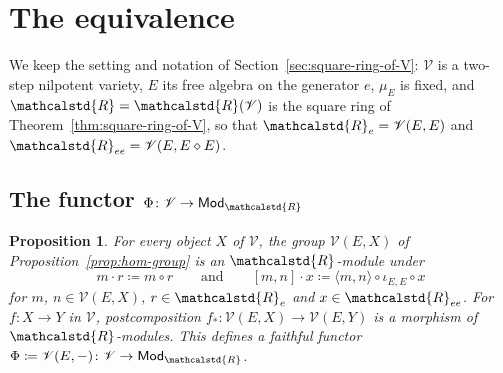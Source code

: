 \documentclass[reqno,a4paper]{amsart}
\theoremstyle{plain}
\newtheorem{proposition}[subsection]{Proposition}
\theoremstyle{definition}
\newcommand{\DefEq}{\coloneq}
\newcommand{\V}{\ensuremath{\mathcal{V}}}
\newcommand{\R}{\ensuremath{\mathcalstd{R}}}
\newcommand{\Mod}{\ensuremath{\mathsf{Mod}}}
\newcommand{\cosmash}{\ensuremath{\diamond}}
\renewcommand{\Re}{\ensuremath{\R_{e}}}
\newcommand{\Ree}{\ensuremath{\R_{ee}}}
\newcommand{\brk}[2]{\ensuremath{[#1,#2]}}
\begin{document}
\section{The equivalence}\label{sec:equivalence}

We keep the setting and notation of Section~\ref{sec:square-ring-of-V}: \(\V\) is a two-step nilpotent variety, \(E\) its free algebra on the generator \(e\), \(\mu_{E}\) is fixed, and \(\R=\R(\V)\) is the square ring of Theorem~\ref{thm:square-ring-of-V}, so that \(\Re=\V(E,E)\) and \(\Ree=\V(E,E\cosmash E)\).

\subsection{The functor \texorpdfstring{\(\Phi\colon \V\to\Mod_{\R}\)}{Phi}}\label{sec:Phi}

\begin{proposition}\label{prop:hom-module}
  For every object \(X\) of \(\V\), the group \(\V(E,X)\) of Proposition~\ref{prop:hom-group} is an \(\R\)-module under
  \[
    m\cdot r\DefEq m\circ r\qquad\text{and}\qquad\brk{m}{n}\cdot x\DefEq\langle m,n\rangle\circ\iota_{E,E}\circ x
  \]
  for \(m\), \(n\in\V(E,X)\), \(r\in\Re\) and \(x\in\Ree\). For \(f\colon X\to Y\) in \(\V\), postcomposition \(f_{*}\colon \V(E,X)\to\V(E,Y)\) is a morphism of \(\R\)-modules. This defines a faithful functor \(\Phi\DefEq\V(E,-)\colon \V\to\Mod_{\R}\).
\end{proposition}
\end{document}
